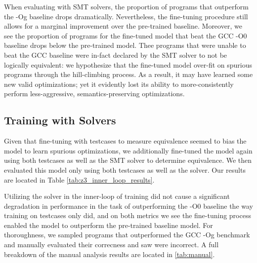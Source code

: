 \documentclass{article}
\begin{document}
When evaluating with SMT solvers, the proportion of programs that outperform the -Og baseline drops dramatically. Nevertheless, the fine-tuning procedure still allows for a marginal improvement over the pre-trained baseline. Moreover, we see the proportion of programs for the fine-tuned model that beat the GCC -O0 baseline drops below the pre-trained model. Thee programs that were unable to beat the GCC baseline were in-fact declared by the SMT solver to not be logically equivalent: we hypothesize that the fine-tuned model over-fit on spurious programs through the hill-climbing process. As a result, it may have learned some new valid optimizations; yet it evidently lost its ability to more-consistently perform less-aggressive, semantics-preserving optimizations. 

\subsection{Training with Solvers}

Given that fine-tuning with testcases to measure equivalence seemed to bias the model to learn spurious optimizations, we additionally fine-tuned the model again using both testcases as well as the SMT solver to determine equivalence. We then evaluated this model only using both testcases as well as the solver. Our results are located in Table \ref{tab:z3_inner_loop_results}. 

Utilizing the solver in the inner-loop of training did not cause a significant degradation in performance in the task of outperforming the -O0 baseline the way training on testcases only did, and on both metrics we see the fine-tuning process enabled the model to outperform the pre-trained baseline model. For thoroughness, we sampled  programs that outperformed the GCC -Og benchmark and manually evaluated their correcness and saw  were incorrect. A full breakdown of the manual analysis results are located in \ref{tab:manual}.


\end{document}
